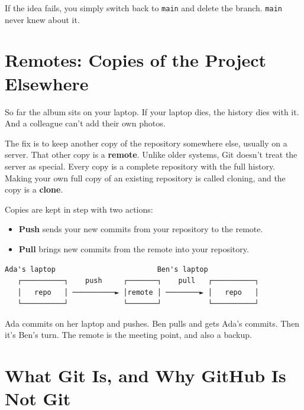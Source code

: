 If the idea fails, you simply switch back to \texttt{main} and delete the branch. \texttt{main} never knew about it.

\section{Remotes: Copies of the Project Elsewhere}\label{04-why-code-needs-a-history:remotes-copies-of-the-project-elsewhere}

So far the album sits on your laptop. If your laptop dies, the history dies with it. And a colleague can't add their own photos.

The fix is to keep another copy of the repository somewhere else, usually on a server. That other copy is a \textbf{remote}. Unlike older systems, Git doesn't treat the server as special. Every copy is a complete repository with the full history. Making your own full copy of an existing repository is called cloning, and the copy is a \textbf{clone}.

Copies are kept in step with two actions:

\begin{itemize}
\tightlist
\item
  \textbf{Push} sends your new commits from your repository to the remote.
\item
  \textbf{Pull} brings new commits from the remote into your repository.
\end{itemize}

\begin{codeblock}
\begin{Verbatim}[breaklines=false, fontsize=\fontsize{8.8}{8.68}\selectfont, fontfamily=diagrammono, formatcom=\diagramlines]
   Ada's laptop                        Ben's laptop
   ┌──────────┐    push     ┌───────┐    pull   ┌──────────┐
   │   repo   │ ──────────► │remote │ ────────► │   repo   │
   └──────────┘             └───────┘           └──────────┘
\end{Verbatim}
\end{codeblock}

Ada commits on her laptop and pushes. Ben pulls and gets Ada's commits. Then it's Ben's turn. The remote is the meeting point, and also a backup.

\section{What Git Is, and Why GitHub Is Not Git}\label{04-why-code-needs-a-history:what-git-is-and-why-github-is-not-git}

